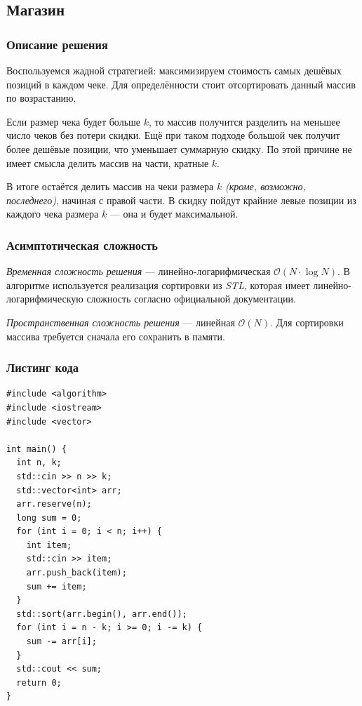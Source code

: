 \subsection{Магазин}

\subsubsection{Описание решения}

Воспользуемся жадной стратегией: максимизируем стоимость самых дешёвых позиций в каждом чеке. Для определённости стоит отсортировать данный массив по возрастанию.

Если размер чека будет больше \( k \), то массив получится разделить на меньшее число чеков без потери скидки. Ещё при таком подходе большой чек получит более дешёвые позиции, что уменьшает суммарную скидку. По этой причине не имеет смысла делить массив на части, кратные \( k \).

В итоге остаётся делить массив на чеки размера \( k \) \textit{(кроме, возможно, последнего)}, начиная с правой части. В скидку пойдут крайние левые позиции из каждого чека размера \( k \) --- она и будет максимальной.

\subsubsection{Асимптотическая сложность}

\textit{Временная сложность решения} --- линейно-логарифмическая \( \mathcal{O}(N\cdot\log N) \). В алгоритме используется реализация сортировки из \textit{STL}, которая имеет линейно-логарифмическую сложность согласно официальной документации.

\textit{Пространственная сложность решения} --- линейная \( \mathcal{O}(N) \). Для сортировки массива требуется сначала его сохранить в памяти.

\subsubsection{Листинг кода}

\begin{lstlisting}
#include <algorithm>
#include <iostream>
#include <vector>

int main() {
  int n, k;
  std::cin >> n >> k;
  std::vector<int> arr;
  arr.reserve(n);
  long sum = 0;
  for (int i = 0; i < n; i++) {
    int item;
    std::cin >> item;
    arr.push_back(item);
    sum += item;
  }
  std::sort(arr.begin(), arr.end());
  for (int i = n - k; i >= 0; i -= k) {
    sum -= arr[i];
  }
  std::cout << sum;
  return 0;
}
\end{lstlisting}